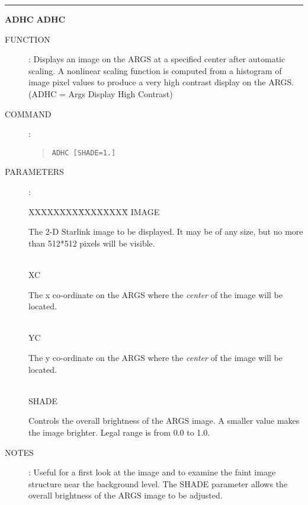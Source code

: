 \goodbreak
\rule{\textwidth}{0.3mm}
{\Large {\bf ADHC} \hfill {\bf ADHC}}
\begin{description}
\item [FUNCTION]:
Displays an image on the ARGS at a specified center after automatic scaling.
A nonlinear scaling function is computed from a histogram of image pixel values
to produce a very high contrast display on the ARGS.
(ADHC = Args Display High Contrast)
\item [COMMAND]:
\begin{quote}
{\tt ADHC  [SHADE=1.]}
\end{quote}
\item [PARAMETERS]:
\begin{tabbing}
XXXXXXXX\=XXXXXXXX\=\kill
IMAGE\>\>\begin{minipage}[t]{100mm}
The 2-D Starlink image to be displayed. It may be of any size, but no more than
512*512 pixels will be visible.
\end{minipage}\\
XC\>\begin{minipage}[t]{100mm}
The x co-ordinate on the ARGS where the {\em center} of the image will be
located.
\end{minipage}\\
YC\>\begin{minipage}[t]{100mm}
The y co-ordinate on the ARGS where the {\em center} of the image will be
located.
\end{minipage}\\
SHADE\>\begin{minipage}[t]{100mm}
Controls the overall brightness of the ARGS image.
A smaller value makes the image brighter.
Legal range is from 0.0 to 1.0.
\end{minipage}
\end{tabbing}
\item [NOTES]:
Useful for a first look at the image and to examine the faint image structure
near the background level.
The SHADE parameter allows the overall brightness of the ARGS image to be
adjusted.
\end{description}

